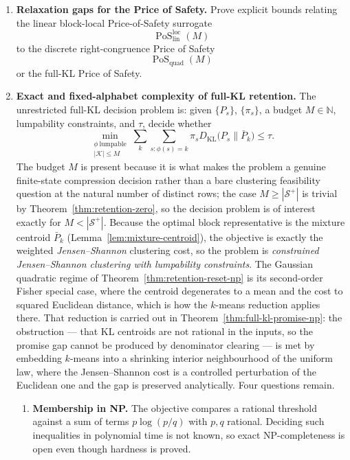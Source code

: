 \documentclass[12pt]{article}
\theoremstyle{definition}
\DeclareMathOperator{\PoS}{PoS}
\newcommand{\PoSlin}{\PoS_{\mathrm{lin}}^{\mathrm{loc}}}
\newcommand{\PoSquad}{\PoS_{\mathrm{quad}}}
\newcommand{\KL}{D_{\mathrm{KL}}}
\newcommand{\Splus}{\mathcal S^{+}}
\begin{document}
\begin{enumerate}[leftmargin=2.0em]
\item \textbf{Relaxation gaps for the Price of Safety.}
Prove explicit bounds relating the linear block-local Price-of-Safety
surrogate
\[
\PoSlin(M)
\]
to the discrete right-congruence Price of Safety
\[
\PoSquad(M)
\]
or the full-KL Price of Safety.

\item \textbf{Exact and fixed-alphabet complexity of full-KL retention.}
The unrestricted full-KL decision problem is: given $\{P_s\}$, $\{\pi_s\}$, a
budget $M\in\mathbb N$, lumpability constraints, and $\tau$, decide whether
\[
\min_{\substack{\phi\ \text{lumpable}\\|\mathcal K|\le M}}
\sum_k\sum_{s:\phi(s)=k}\pi_s\KL\bigl(P_s\|\bar P_k\bigr)
\le\tau .
\]
The budget $M$ is present because it is what makes the problem a genuine
finite-state compression decision rather than a bare clustering feasibility
question at the natural number of distinct rows; the case $M\ge|\Splus|$ is
trivial by Theorem~\ref{thm:retention-zero}, so the decision problem is of
interest exactly for $M<|\Splus|$.
Because the optimal block representative is the mixture centroid
$\bar P_k$ (Lemma~\ref{lem:mixture-centroid}), the objective is exactly the
weighted \emph{Jensen--Shannon} clustering cost, so the problem is
\emph{constrained Jensen--Shannon clustering with lumpability constraints}.
The Gaussian quadratic regime of Theorem~\ref{thm:retention-reset-np} is its
second-order Fisher special case, where the centroid degenerates to a mean and
the cost to squared Euclidean distance, which is how the $k$-means reduction
applies there.  That reduction is carried out in Theorem~\ref{thm:full-kl-promise-np}: the
obstruction --- that KL centroids are not rational in the inputs, so the
promise gap cannot be produced by denominator clearing --- is met by embedding
$k$-means into a shrinking interior neighbourhood of the uniform law, where the
Jensen--Shannon cost is a controlled perturbation of the Euclidean one and the
gap is preserved analytically.  Four questions remain.

\begin{enumerate}[label=(\alph*),leftmargin=2.0em]
\item \textbf{Membership in NP.}  The objective compares a rational threshold
against a sum of terms $p\log(p/q)$ with $p,q$ rational.  Deciding such
inequalities in polynomial time is not known, so exact NP-completeness is open
even though hardness is proved.


\end{enumerate}
\end{enumerate}
\end{document}
